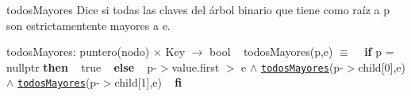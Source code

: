 \begin{DoxyParagraph}{todos\+Mayores}
Dice si todas las claves del árbol binario que tiene como raíz a p son estrictamentente mayores a e.

todos\+Mayores\+: puntero(nodo) $\times$ Key $\to$ bool ~\newline
todos\+Mayores(p,e) $\equiv$ ~\newline
{\bfseries if} p = nullptr {\bfseries then} ~\newline
true ~\newline
{\bfseries else} ~\newline
p-\/$>$value.\+first $>$ e $\land$ \href{axiomas.html#todosMayores}{\tt todos\+Mayores}(p-\/$>$child\mbox{[}0\mbox{]},e) $\land$ \href{axiomas.html#todosMayores}{\tt todos\+Mayores}(p-\/$>$child\mbox{[}1\mbox{]},e) ~\newline
 {\bfseries fi} 
\end{DoxyParagraph}
